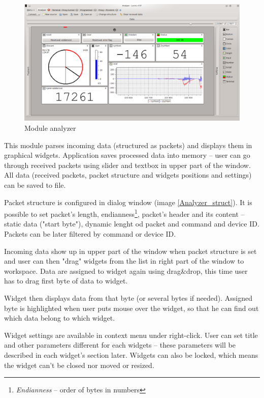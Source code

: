 \documentclass[12pt, a4paper, oneside]{article}
\newcommand{\It}{\textit}  %
\begin{document}
\begin{figure}[h]
\begin{center}
\includegraphics[width=\textwidth]{img/analyzer_all.png}
\caption{Module analyzer}
\label{Analyzer}
\end{center}
\end{figure}

This module parses incoming data (structured as packets) and displays them in graphical widgets. Application saves processed data into memory -- user can go through received packets using slider and textbox in upper part of the window. All data (received packets, packet structure and widgets positions and settings) can be saved to file. 

Packet structure is configured in dialog window (image \ref{Analyzer_struct}). It is possible to set packet's length, endianness\footnote{\It{Endianness} -- order of bytes in numbers}, packet's header and its content -- static data ("start byte"), dynamic lenght od packet and command and device ID. Packets can be later filtered by command or device ID.

\newpage
\setlength{\voffset}{0mm}
\pagestyle{plain}

Incoming data show up in upper part of the window when packet structure is set and user can then "drag" widgets from the list in right part of the window to workspace. Data are assigned to widget again using drag\&drop, this time user has to drag first byte of data to widget.

Widget then displays data from that byte (or several bytes if needed). Assigned byte is highlighted when user puts mouse over the widget, so that he can find out which data belong to which widget.

Widget settings are available in context menu under right-click. User can set title and other parameters different for each widgets -- these parameters will be described in each widget's section later. Widgets can also be locked, which means the widget can't be closed nor moved or resized.
\end{document}
